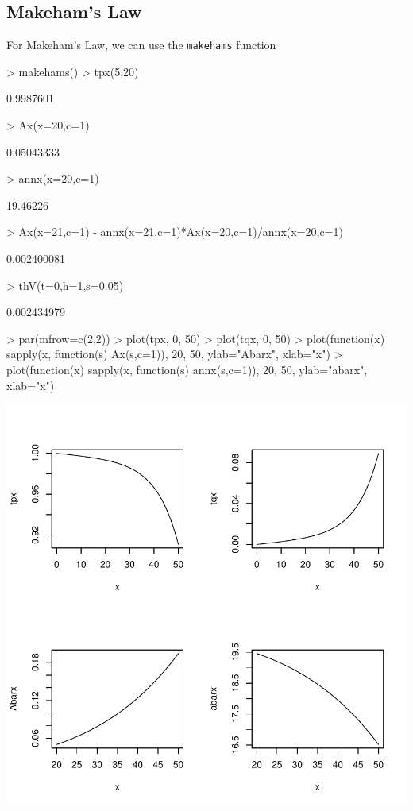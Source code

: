 \documentclass[landscape]{article}
\begin{document}
\subsection{Makeham's Law}
For Makeham's Law, we can use the \texttt{makehams} function
\begin{Schunk}
\begin{Sinput}
> makehams()
> tpx(5,20)
\end{Sinput}
\begin{Soutput}
[1] 0.9987601
\end{Soutput}
\begin{Sinput}
> Ax(x=20,c=1)
\end{Sinput}
\begin{Soutput}
[1] 0.05043333
\end{Soutput}
\begin{Sinput}
> annx(x=20,c=1)
\end{Sinput}
\begin{Soutput}
[1] 19.46226
\end{Soutput}
\begin{Sinput}
> Ax(x=21,c=1) - annx(x=21,c=1)*Ax(x=20,c=1)/annx(x=20,c=1)
\end{Sinput}
\begin{Soutput}
[1] 0.002400081
\end{Soutput}
\begin{Sinput}
> thV(t=0,h=1,s=0.05)
\end{Sinput}
\begin{Soutput}
[1] 0.002434979
\end{Soutput}
\begin{Sinput}
> par(mfrow=c(2,2))
> plot(tpx, 0, 50)
> plot(tqx, 0, 50)
> plot(function(x) sapply(x, function(s) Ax(s,c=1)), 20, 50, ylab="Abarx", xlab="x")
> plot(function(x) sapply(x, function(s) annx(s,c=1)), 20, 50, ylab="abarx", xlab="x")
\end{Sinput}
\end{Schunk}
\includegraphics{survivalModels-003}
\end{document}
